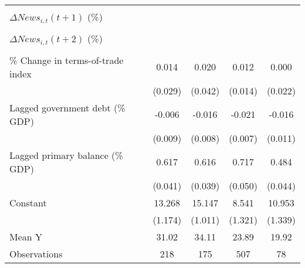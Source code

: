 {\begin{tabular}{l*{4}{c}}
                    &                     &                     &                     &                     \\
\addlinespace
$ \Delta News_{i,t}(t+1)$ (\%)&                     &                     &                     &                     \\
                    &                     &                     &                     &                     \\
\addlinespace
$ \Delta News_{i,t}(t+2)$ (\%)&                     &                     &                     &                     \\
                    &                     &                     &                     &                     \\
\addlinespace
\% Change in terms-of-trade index&       0.014         &       0.020         &       0.012         &       0.000         \\
                    &     (0.029)         &     (0.042)         &     (0.014)         &     (0.022)         \\
\addlinespace
Lagged government debt (\% GDP)&      -0.006         &      -0.016\sym{*}  &      -0.021\sym{***}&      -0.016         \\
                    &     (0.009)         &     (0.008)         &     (0.007)         &     (0.011)         \\
\addlinespace
Lagged primary balance (\% GDP)&       0.617\sym{***}&       0.616\sym{***}&       0.717\sym{***}&       0.484\sym{***}\\
                    &     (0.041)         &     (0.039)         &     (0.050)         &     (0.044)         \\
\addlinespace
Constant            &      13.268\sym{***}&      15.147\sym{***}&       8.541\sym{***}&      10.953\sym{***}\\
                    &     (1.174)         &     (1.011)         &     (1.321)         &     (1.339)         \\
\midrule
Mean Y              &       31.02         &       34.11         &       23.89         &       19.92         \\
Observations        &         218         &         175         &         507         &          78         \\
\bottomrule
\end{tabular}
}

